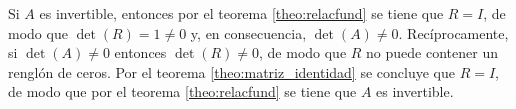 \documentclass[a4paper,12pt]{article}
\begin{document}
Si $A$ es invertible, entonces por el teorema \ref{theo:relacfund} se tiene
que $R=I$, de modo que $\det(R)=1\ne0$ y, en consecuencia, $\det(A)\ne0$.
Recíprocamente, si $\det(A)\ne0$ entonces $\det(R)\ne0$, de modo que $R$ no
puede contener un renglón de ceros. Por el teorema \ref{theo:matriz_identidad}
se concluye que $R=I$, de modo que por el teorema \ref{theo:relacfund} se
tiene que $A$ es invertible.
\end{document}
